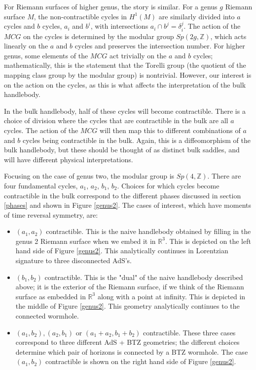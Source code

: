 \documentclass[12pt]{article}
\newcommand{\RR}{\mathbb{R}} %
\newcommand{\ZZ}{\mathbb{Z}} %
\numberwithin{equation}{section}
\begin{document}
For Riemann surfaces of higher genus, the story is similar.  For a genus $g$ Riemann surface $M$, the non-contractible cycles in $H^1(M)$  are similarly divided into $a$ cycles and $b$ cycles,  $a_i$ and $b^i$, with intersections $a_i\cap b^j = \delta_{i}^j$. The action of the $MCG$ on the cycles is determined by the modular group $Sp(2g,\ZZ)$, which acts linearly on the $a$ and $b$ cycles and preserves the intersection number. For higher genus, some elements of the $MCG$ act trivially on the $a$ and $b$ cycles; mathematically, this is the statement that the Torelli group (the quotient of the mapping class group by the modular group) is nontrivial. However, our interest is on the action on the cycles, as this is what affects the interpretation of the bulk handlebody.

 In the bulk handlebody, half of these cycles will become contractible. There is a choice of division where the cycles that are contractible in the bulk are all $a$ cycles. The action of the $MCG$ will then map this to different combinations of $a$ and $b$ cycles being contractible in the bulk. Again, this is a diffeomorphism of the bulk handlebody, but these should be thought of as distinct bulk saddles, and will have different physical interpretations.

 Focusing on the case of genus two, the modular group is $Sp(4,\ZZ)$. There are four fundamental cycles, $a_1$, $a_2$, $b_1$, $b_2$. Choices for which cycles become contractible in the bulk correspond to the different phases discussed in section \ref{phases} and shown in Figure \ref{genus2}. The cases of interest, which have moments of time reversal symmetry, are:
 \begin{itemize}
 \item
 $(a_1, a_2)$ contractible.  This is the naive handlebody obtained by filling in the genus 2 Riemann surface when we embed it in $\RR^3$.  This is depicted on the left hand side of Figure \ref{genus2}.  This analytically continues in Lorentzian signature to three disconnected AdS's.
\item
  $(b_1, b_2)$ contractible.  This is the "dual" of the naive handlebody described above; it is the exterior of the Riemann surface, if we think of the Riemann surface as embedded in $\RR^3$ along with a point at infinity.
  This is depicted in the middle of Figure \ref{genus2}. This geometry analytically continues to the connected wormhole.
  \item
 $(a_1, b_2), (a_2, b_1)$ or $(a_1 + a_2, b_1 + b_2)$ contractible.  These three cases  correspond to three different AdS + BTZ geometries; the different choices determine which pair of  horizons is connected by a BTZ wormhole.
 The case $(a_1,b_2)$ contractible is shown on the right hand side of Figure \ref{genus2}.
  \end{itemize}
\end{document}
